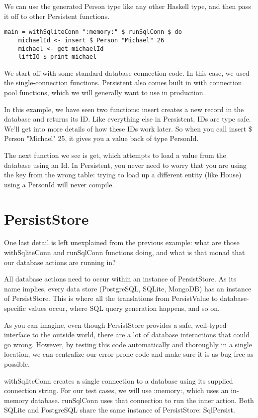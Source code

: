 We can use the generated Person type like any other Haskell type, and then pass it off to other Persistent functions.

\begin{lstlisting}
main = withSqliteConn ":memory:" $ runSqlConn $ do
    michaelId <- insert $ Person "Michael" 26
    michael <- get michaelId
    liftIO $ print michael
\end{lstlisting}%

We start off with some standard database connection code. In this case, we used the single-connection functions. Persistent also comes built in with connection pool functions, which we will generally want to use in production.

In this example, we have seen two functions: insert creates a new record in the database and returns its ID. Like everything else in Persistent, IDs are type safe. We'll get into more details of how these IDs work later. So when you call insert \$ Person "Michael" 25, it gives you a value back of type PersonId.

The next function we see is get, which attempts to load a value from the database using an Id. In Persistent, you never need to worry that you are using the key from the wrong table: trying to load up a different entity (like House) using a PersonId will never compile.

\section{PersistStore}

One last detail is left unexplained from the previous example: what are those withSqliteConn and runSqlConn functions doing, and what is that monad that our database actions are running in?

All database actions need to occur within an instance of PersistStore. As its name implies, every data store (PostgreSQL, SQLite, MongoDB) has an instance of PersistStore. This is where all the translations from PersistValue to database-specific values occur, where SQL query generation happens, and so on.

As you can imagine, even though PersistStore provides a safe, well-typed interface to the outside world, there are a lot of database interactions that could go wrong. However, by testing this code automatically and thoroughly in a single location, we can centralize our error-prone code and make sure it is as bug-free as possible.

withSqliteConn creates a single connection to a database using its supplied connection string. For our test cases, we will use :memory:, which uses an in-memory database. runSqlConn uses that connection to run the inner action. Both SQLite and PostgreSQL share the same instance of PersistStore: SqlPersist.

